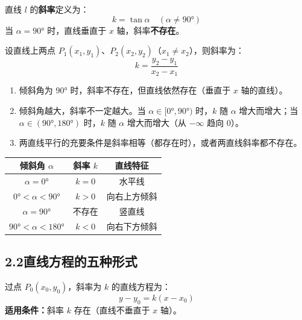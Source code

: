 \documentclass[12pt, a4paper]{ctexart}
\begin{document}
\begin{knowledgebox}[斜率的定义与计算]
直线 $l$ 的\textbf{斜率}定义为：
\[
k = \tan\alpha \quad (\alpha \neq 90°)
\]
当 $\alpha = 90°$ 时，直线垂直于 $x$ 轴，斜率\textbf{不存在}。

设直线上两点 $P_1(x_1, y_1)$、$P_2(x_2, y_2)$（$x_1 \neq x_2$），则斜率为：
\[
k = \frac{y_2 - y_1}{x_2 - x_1}
\]
\end{knowledgebox}

\begin{warnbox}[易错提醒]
\begin{enumerate}[label=(\arabic*)]
  \item 倾斜角为 $90°$ 时，斜率不存在，但直线依然存在（垂直于 $x$ 轴的直线）。
  \item 倾斜角越大，斜率不一定越大。当 $\alpha \in [0°, 90°)$ 时，$k$ 随 $\alpha$ 增大而增大；当 $\alpha \in (90°, 180°)$ 时，$k$ 随 $\alpha$ 增大而增大（从 $-\infty$ 趋向 $0$）。
  \item 两直线平行的充要条件是斜率相等（都存在时），或者两直线斜率都不存在。
\end{enumerate}
\end{warnbox}

\begin{tipbox}[斜率与倾斜角的对应关系]
\begin{center}
\renewcommand{\arraystretch}{1.3}
\begin{tabular}{c|c|c}
\toprule
倾斜角 $\alpha$ & 斜率 $k$ & 直线特征 \\
\midrule
$\alpha = 0°$ & $k = 0$ & 水平线 \\
$0° < \alpha < 90°$ & $k > 0$ & 向右上方倾斜 \\
$\alpha = 90°$ & 不存在 & 竖直线 \\
$90° < \alpha < 180°$ & $k < 0$ & 向右下方倾斜 \\
\bottomrule
\end{tabular}
\end{center}
\end{tipbox}

\subsection*{2.2\quad 直线方程的五种形式}

\begin{knowledgebox}[点斜式]
过点 $P_0(x_0, y_0)$，斜率为 $k$ 的直线方程为：
\[
\boxed{y - y_0 = k(x - x_0)}
\]
\textbf{适用条件：}斜率 $k$ 存在（直线不垂直于 $x$ 轴）。
\end{knowledgebox}
\end{document}
